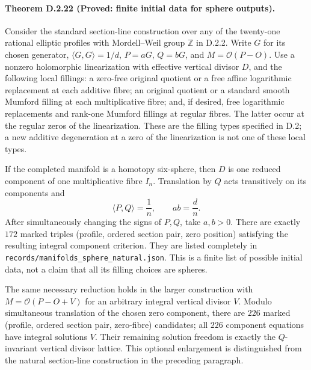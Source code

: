 \paragraph{Theorem D.2.22 (Proved: finite initial data for sphere outputs).}
Consider the standard section-line construction over any of the twenty-one
rational elliptic profiles with Mordell--Weil group $\mathbb Z$ in D.2.2.
Write $G$ for its chosen generator, $\langle G,G\rangle=1/d$,
$P=aG$, $Q=bG$, and $M=\mathcal O(P-O)$. Use a nonzero holomorphic
linearization with effective vertical divisor $D$, and the following local
fillings: a zero-free original quotient or a free affine logarithmic
replacement at each additive fibre; an original quotient or a standard
smooth Mumford filling at each multiplicative fibre; and, if desired,
free logarithmic replacements and rank-one Mumford fillings at regular
fibres. The latter occur at the regular zeros of the linearization.
These are the filling types specified in D.2; a new additive degeneration
at a zero of the linearization is not one of these local types.

If the completed manifold is a homotopy six-sphere, then $D$ is one
reduced component of one multiplicative fibre $I_n$. Translation by $Q$
acts transitively on its components and
\[
             \langle P,Q\rangle=\frac1n,
             \qquad ab=\frac dn.                                      \tag{D.FI1}
\]
After simultaneously changing the signs of $P,Q$, take $a,b>0$.
There are exactly $172$ marked triples (profile, ordered section pair,
zero position) satisfying the resulting integral component criterion.
They are listed completely in
\texttt{records/manifolds\_sphere\_natural.json}.
This is a finite list of possible initial data, not a claim that all
its filling choices are spheres.

The same necessary reduction holds in the larger construction with
$M=\mathcal O(P-O+V)$ for an arbitrary integral vertical divisor $V$.
Modulo simultaneous translation of the chosen zero component, there
are $226$ marked (profile, ordered section pair, zero-fibre) candidates;
all $226$ component equations have integral solutions $V$.
Their remaining solution freedom is exactly the $Q$-invariant vertical
divisor lattice. This optional enlargement is distinguished from the
natural section-line construction in the preceding paragraph.

